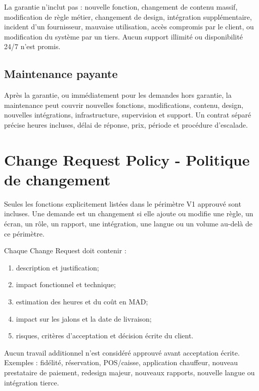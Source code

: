 \documentclass[10pt,a4paper]{article}
\begin{document}
La garantie n'inclut pas : nouvelle fonction, changement de contenu massif, modification de règle métier, changement de design, intégration supplémentaire, incident d'un fournisseur, mauvaise utilisation, accès compromis par le client, ou modification du système par un tiers. Aucun support illimité ou disponibilité 24/7 n'est promis.

\subsection{Maintenance payante}
Après la garantie, ou immédiatement pour les demandes hors garantie, la maintenance peut couvrir nouvelles fonctions, modifications, contenu, design, nouvelles intégrations, infrastructure, supervision et support. Un contrat séparé précise heures incluses, délai de réponse, prix, période et procédure d'escalade.

\section{Change Request Policy - Politique de changement}
Seules les fonctions explicitement listées dans le périmètre V1 approuvé sont incluses. Une demande est un changement si elle ajoute ou modifie une règle, un écran, un rôle, un rapport, une intégration, une langue ou un volume au-delà de ce périmètre.

Chaque Change Request doit contenir :
\begin{enumerate}
  \item description et justification;
  \item impact fonctionnel et technique;
  \item estimation des heures et du coût en MAD;
  \item impact sur les jalons et la date de livraison;
  \item risques, critères d'acceptation et décision écrite du client.
\end{enumerate}
Aucun travail additionnel n'est considéré approuvé avant acceptation écrite. Exemples : fidélité, réservation, POS/caisse, application chauffeur, nouveau prestataire de paiement, redesign majeur, nouveaux rapports, nouvelle langue ou intégration tierce.
\end{document}
